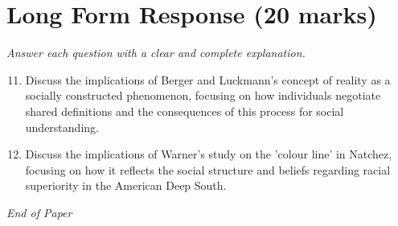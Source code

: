 \documentclass[12pt]{article}
\begin{document}
\section*{Long Form Response (20 marks)}
\textit{Answer each question with a clear and complete explanation.}
\begin{enumerate}[label=\arabic*.]
\setcounter{enumi}{10}
\item Discuss the implications of Berger and Luckmann's concept of reality as a socially constructed phenomenon, focusing on how individuals negotiate shared definitions and the consequences of this process for social understanding.
\item Discuss the implications of Warner's study on the 'colour line' in Natchez, focusing on how it reflects the social structure and beliefs regarding racial superiority in the American Deep South.
\end{enumerate}

\vfill
\noindent\textit{End of Paper}
\end{document}
